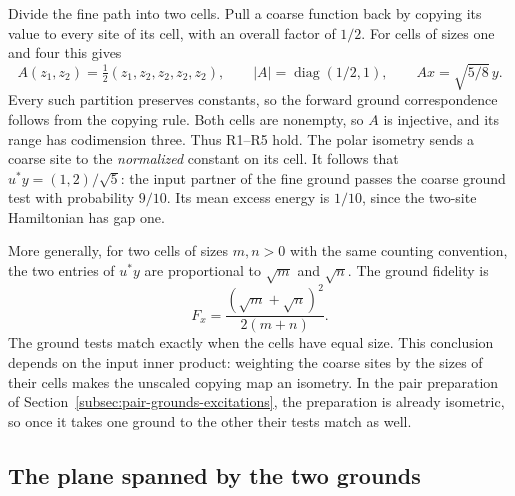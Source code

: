 \documentclass[11pt]{article}
\theoremstyle{definition}
\begin{document}
Divide the fine path into two cells. Pull a coarse function back by copying its value to every site of its cell, with an overall factor of $1/2$. For cells of sizes one and four this gives
\[
 A(z_1,z_2)=\tfrac12(z_1,z_2,z_2,z_2,z_2),\qquad
 |A|=\operatorname{diag}(1/2,1),\qquad Ax=\sqrt{5/8}\,y .
\]
Every such partition preserves constants, so the forward ground correspondence follows from the copying rule. Both cells are nonempty, so $A$ is injective, and its range has codimension three. Thus R1--R5 hold. The polar isometry sends a coarse site to the \emph{normalized} constant on its cell. It follows that $u^*y=(1,2)/\sqrt5$: the input partner of the fine ground passes the coarse ground test with probability $9/10$. Its mean excess energy is $1/10$, since the two-site Hamiltonian has gap one.

More generally, for two cells of sizes $m,n>0$ with the same counting convention, the two entries of $u^*y$ are proportional to $\sqrt m$ and $\sqrt n$. The ground fidelity is
\[
 F_x=\frac{(\sqrt m+\sqrt n)^2}{2(m+n)} .
\]
The ground tests match exactly when the cells have equal size. This conclusion depends on the input inner product: weighting the coarse sites by the sizes of their cells makes the unscaled copying map an isometry. In the pair preparation of Section~\ref{subsec:pair-grounds-excitations}, the preparation is already isometric, so once it takes one ground to the other their tests match as well.

\subsection{The plane spanned by the two grounds}
\label{subsec:ground-plane}
\end{document}
